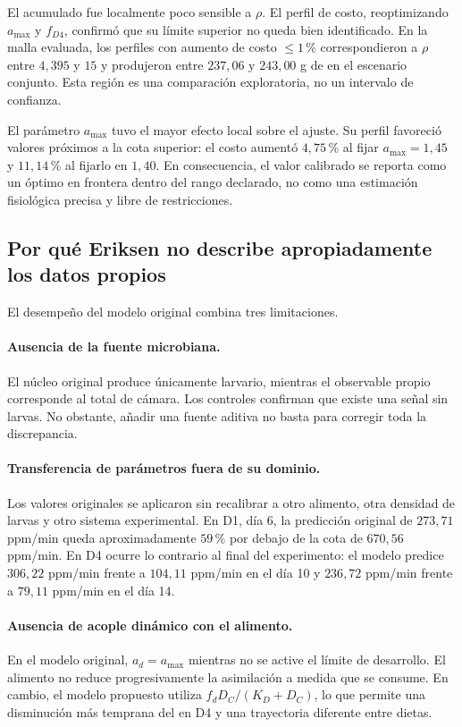 El acumulado fue localmente poco sensible a $\rho$. El perfil de costo,
reoptimizando $a_{\max}$ y $f_{D4}$, confirmó que su límite superior no
queda bien identificado. En la malla evaluada, los perfiles con aumento de
costo $\leq1$\,\% correspondieron a $\rho$ entre $4{,}395$ y $15$ y
produjeron entre $237{,}06$ y $243{,}00$ g de \co{} en el escenario
conjunto. Esta región es una comparación exploratoria, no un intervalo de
confianza.

El parámetro $a_{\max}$ tuvo el mayor efecto local sobre el ajuste. Su
perfil favoreció valores próximos a la cota superior: el costo aumentó
$4{,}75$\,\% al fijar $a_{\max}=1{,}45$ y $11{,}14$\,\% al fijarlo en
$1{,}40$. En consecuencia, el valor calibrado se reporta como un óptimo en
frontera dentro del rango declarado, no como una estimación fisiológica
precisa y libre de restricciones.

\subsection{Por qué Eriksen no describe apropiadamente los datos propios}

El desempeño del modelo original combina tres limitaciones.

\paragraph{Ausencia de la fuente microbiana.}
El núcleo original produce únicamente \co{} larvario, mientras el
observable propio corresponde al total de cámara. Los controles confirman
que existe una señal sin larvas. No obstante, añadir una fuente aditiva
no basta para corregir toda la discrepancia.

\paragraph{Transferencia de parámetros fuera de su dominio.}
Los valores originales se aplicaron sin recalibrar a otro alimento,
otra densidad de larvas y otro sistema experimental. En D1, día 6, la
predicción original de $273{,}71$ ppm/min queda aproximadamente
$59$\,\% por debajo de la cota de $670{,}56$ ppm/min. En D4 ocurre lo
contrario al final del experimento: el modelo predice
$306{,}22$ ppm/min frente a $104{,}11$ ppm/min en el día 10 y
$236{,}72$ ppm/min frente a $79{,}11$ ppm/min en el día 14.

\paragraph{Ausencia de acople dinámico con el alimento.}
En el modelo original, $a_d=a_{\max}$ mientras no se active el límite de
desarrollo. El alimento no reduce progresivamente la asimilación a
medida que se consume. En cambio, el modelo propuesto utiliza
$f_dD_C/(K_D+D_C)$, lo que permite una disminución más temprana del
\co{} en D4 y una trayectoria diferente entre dietas.

